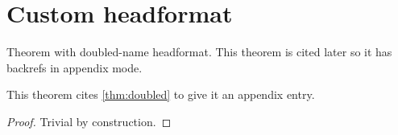 \documentclass{article}
\begin{document}
\section{Custom headformat}

\begin{theorem}\label{thm:doubled}
  Theorem with doubled-name headformat.  This theorem is cited later
  so it has backrefs in appendix mode.
\end{theorem}

\begin{theorem}\label{thm:citer}
  This theorem cites \ref{thm:doubled} to give it an appendix entry.
\end{theorem}

\begin{proof}
  Trivial by construction.
\end{proof}
\end{document}
